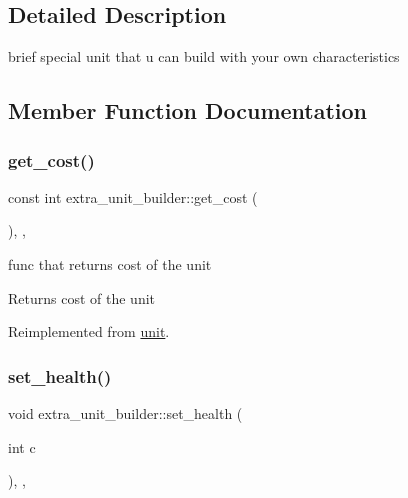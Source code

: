 \subsection{Detailed Description}
brief special unit that u can build with your own characteristics 

\subsection{Member Function Documentation}
\mbox{\label{classextra__unit__builder_a84ce334361c5acd1a59775a74fabde86}} 
\subsubsection{\texorpdfstring{get\+\_\+cost()}{get\_cost()}}
{\footnotesize\ttfamily const int extra\+\_\+unit\+\_\+builder\+::get\+\_\+cost (\begin{DoxyParamCaption}{ }\end{DoxyParamCaption})\hspace{0.3cm}{\ttfamily [inline]}, {\ttfamily [override]}, {\ttfamily [virtual]}}

func that returns cost of the unit \begin{DoxyReturn}{Returns}
cost of the unit 
\end{DoxyReturn}


Reimplemented from \mbox{\hyperlink{classunit_a817ef860467c21c378deb39f738c33e0}{unit}}.

\mbox{\label{classextra__unit__builder_a7471f05c65d3f2c230c405ec0bcdaa7d}} 
\subsubsection{\texorpdfstring{set\+\_\+health()}{set\_health()}}
{\footnotesize\ttfamily void extra\+\_\+unit\+\_\+builder\+::set\+\_\+health (\begin{DoxyParamCaption}\item[{int}]{c }\end{DoxyParamCaption})\hspace{0.3cm}{\ttfamily [inline]}, {\ttfamily [override]}, {\ttfamily [virtual]}}

